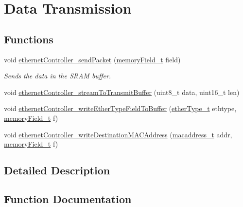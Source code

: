 \hypertarget{group__data__transmission}{}\section{Data Transmission}
\label{group__data__transmission}
\subsection*{Functions}
\begin{DoxyCompactItemize}
\item 
void \mbox{\hyperlink{group__data__transmission_gacab51e5c9afa0f0b90e6694bcfc7d936}{ethernet\+Controller\+\_\+send\+Packet}} (\mbox{\hyperlink{group__memory_ga1d04d80fae40964f55d2df46b5d64785}{memory\+Field\+\_\+t}} field)
\begin{DoxyCompactList}\small\item\em Sends the data in the S\+R\+AM buffer. \end{DoxyCompactList}\item 
void \mbox{\hyperlink{group__data__transmission_ga9c0d9b39642cf6b7e220b9f0b44e3e02}{ethernet\+Controller\+\_\+stream\+To\+Transmit\+Buffer}} (uint8\+\_\+t data, uint16\+\_\+t len)
\item 
void \mbox{\hyperlink{group__data__transmission_ga8fa7a1c372901218a6c545df21fc9ef3}{ethernet\+Controller\+\_\+write\+Ether\+Type\+Field\+To\+Buffer}} (\mbox{\hyperlink{group__ethernet_ga467703afefdcaf7893a7da3eb63280ed}{ether\+Type\+\_\+t}} ethtype, \mbox{\hyperlink{group__memory_ga1d04d80fae40964f55d2df46b5d64785}{memory\+Field\+\_\+t}} f)
\item 
void \mbox{\hyperlink{group__data__transmission_ga858fd557b9ef00b3fd8166381e415bec}{ethernet\+Controller\+\_\+write\+Destination\+M\+A\+C\+Address}} (\mbox{\hyperlink{group__ethernet_gacb865bcbf50a6c8cef05581bfabff373}{macaddress\+\_\+t}} addr, \mbox{\hyperlink{group__memory_ga1d04d80fae40964f55d2df46b5d64785}{memory\+Field\+\_\+t}} f)
\end{DoxyCompactItemize}


\subsection{Detailed Description}


\subsection{Function Documentation}
\mbox{\label{group__data__transmission_gacab51e5c9afa0f0b90e6694bcfc7d936}} 
